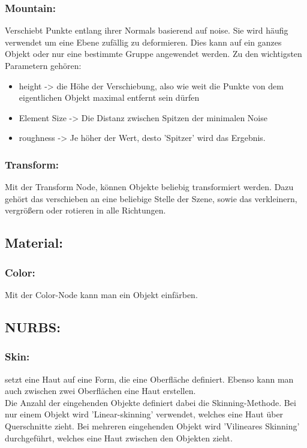 \documentclass[paper=a4,fontsize=12pt,ngerman]{scrartcl}
\begin{document}
	\subsubsection*{Mountain:}
	Verschiebt Punkte entlang ihrer Normals basierend auf noise. Sie wird häufig verwendet um eine Ebene zufällig zu deformieren. Dies kann auf ein ganzes Objekt oder nur eine bestimmte Gruppe angewendet werden. Zu den wichtigsten Parametern gehören:
	\begin{itemize}
		\item height -> die Höhe der Verschiebung, also wie weit die Punkte von dem eigentlichen Objekt maximal entfernt sein dürfen
		\item Element Size -> Die Distanz zwischen Spitzen der minimalen Noise
		\item roughness -> Je höher der Wert, desto 'Spitzer' wird das Ergebnis.
	\end{itemize}
	\subsubsection*{Transform:}
	Mit der Transform Node, können Objekte beliebig transformiert werden. Dazu gehört das verschieben an eine beliebige Stelle der Szene, sowie das verkleinern, vergrößern oder rotieren in alle Richtungen.
	
	\subsection*{Material:}
	\subsubsection*{Color:}
	Mit der Color-Node kann man ein Objekt einfärben.
	
	\subsection*{NURBS:}
	\subsubsection*{Skin:}
	setzt eine Haut auf eine Form, die eine Oberfläche definiert. Ebenso kann man auch zwischen zwei Oberflächen eine Haut erstellen.\\ 
	Die Anzahl der eingehenden Objekte definiert dabei die Skinning-Methode. Bei nur einem Objekt wird 'Linear-skinning' verwendet, welches eine Haut über Querschnitte zieht. Bei mehreren eingehenden Objekt wird 'Vilineares Skinning' durchgeführt, welches eine Haut zwischen den Objekten zieht.
	
\end{document}
